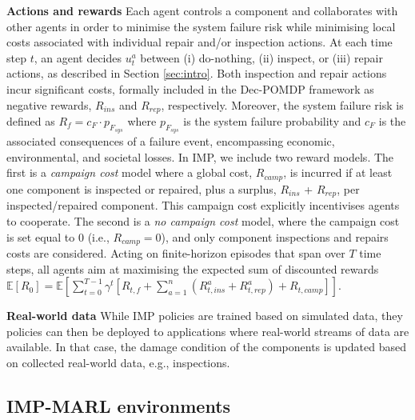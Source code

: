 \textbf{Actions and rewards}
Each agent controls a component and collaborates with other agents in order to minimise the system failure risk while minimising local costs associated with individual repair and/or inspection actions. 
At each time step $t$, an agent decides $u^a_t$ between (i) do-nothing, (ii) inspect, or (iii) repair actions, as described in Section \ref{sec:intro}.
Both inspection and repair actions incur significant costs, formally included in the Dec-POMDP framework as negative rewards, $R_{ins}$ and $R_{rep}$, respectively.
Moreover, the system failure risk is defined as $R_f= c_F \cdot p_{F_{sys}}$ where $p_{F_{sys}}$ is the system failure probability and $c_F$ is the associated consequences of a failure event, encompassing economic, environmental, and societal losses.
In IMP, we include two reward models.
The first is a \emph{campaign cost} model where a global cost, $R_{camp}$, is incurred if at least one component is inspected or repaired, plus a surplus, $R_{ins}$ + $R_{rep}$, per inspected/repaired component.
This campaign cost explicitly incentivises agents to cooperate.
The second is a \emph{no campaign cost} model, where the campaign cost is set equal to 0 (i.e., $R_{camp}=0$), and only component inspections and repairs costs are considered. 
Acting on finite-horizon episodes that span over $T$ time steps, all agents aim at maximising the expected sum of discounted rewards $\mathbb{E}[R_{0}] = \mathbb{E} \left[ \sum_{t=0}^{T-1} \gamma^t \left[ R_{t,f}+ \sum_{a=1}^n \left({R_{t,ins}^a} + {R_{t,rep}^a}\right)+R_{t,camp} \right] \right]$.


\textbf{Real-world data} While IMP policies are trained based on simulated data, they policies can then be deployed to applications where real-world streams of data are available. In that case, the damage condition of the components is updated based on collected real-world data, e.g., inspections.
 
\subsection{IMP-MARL environments}
\label{time stepsec:implement_env}


